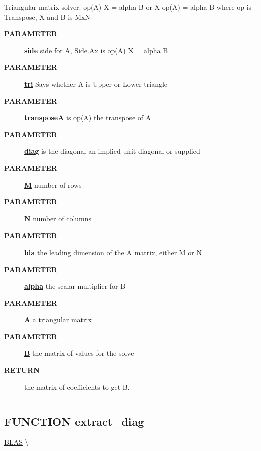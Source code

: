 \par
Triangular matrix solver. op(A) X = alpha B or X op(A) = alpha B where op is Transpose, X and B is MxN

\par
\begin{description}
\item [\colorbox{tagtype}{\color{white} \textbf{\textsf{PARAMETER}}}] \textbf{\underline{side}} side for A, Side.Ax is op(A) X = alpha B
\item [\colorbox{tagtype}{\color{white} \textbf{\textsf{PARAMETER}}}] \textbf{\underline{tri}} Says whether A is Upper or Lower triangle
\item [\colorbox{tagtype}{\color{white} \textbf{\textsf{PARAMETER}}}] \textbf{\underline{transposeA}} is op(A) the transpose of A
\item [\colorbox{tagtype}{\color{white} \textbf{\textsf{PARAMETER}}}] \textbf{\underline{diag}} is the diagonal an implied unit diagonal or supplied
\item [\colorbox{tagtype}{\color{white} \textbf{\textsf{PARAMETER}}}] \textbf{\underline{M}} number of rows
\item [\colorbox{tagtype}{\color{white} \textbf{\textsf{PARAMETER}}}] \textbf{\underline{N}} number of columns
\item [\colorbox{tagtype}{\color{white} \textbf{\textsf{PARAMETER}}}] \textbf{\underline{lda}} the leading dimension of the A matrix, either M or N
\item [\colorbox{tagtype}{\color{white} \textbf{\textsf{PARAMETER}}}] \textbf{\underline{alpha}} the scalar multiplier for B
\item [\colorbox{tagtype}{\color{white} \textbf{\textsf{PARAMETER}}}] \textbf{\underline{A}} a triangular matrix
\item [\colorbox{tagtype}{\color{white} \textbf{\textsf{PARAMETER}}}] \textbf{\underline{B}} the matrix of values for the solve
\item [\colorbox{tagtype}{\color{white} \textbf{\textsf{RETURN}}}] \textbf{\underline{}} the matrix of coefficients to get B.
\end{description}

\rule{\linewidth}{0.5pt}
\subsection*{\textsf{\colorbox{headtoc}{\color{white} FUNCTION}
extract\_diag}}

\hypertarget{ecldoc:blas.extract_diag}{}
\hspace{0pt} \hyperlink{ecldoc:blas}{BLAS} \textbackslash 

